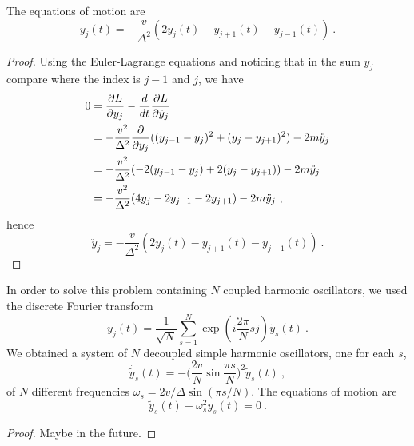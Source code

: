     The equations of motion are 
    \begin{equation*}
        \ddot y_j (t) = - \frac{v}{\Delta^2} ( 2 y_j(t) - y_{j+1} (t) - y_{j-1}(t)) ~.
    \end{equation*}
    \begin{proof}
        Using the Euler-Lagrange equations and noticing that in the sum $y_j$ compare where the index is $j - 1$ and $j$, we have
        \begin{equation*}
        \begin{aligned}
            0 & = \frac{\partial L}{\partial y_j} - \frac{d}{dt} \frac{\partial L}{\partial\dot y_j} \\ & = - \frac{v^2}{\Delta^2} \frac{\partial}{\partial y_j} ((y_{j-1} - y_j)^2 + (y_j - y_{j+1})^2 ) - 2 m \ddot y_j \\ & = - \frac{ v^2}{\Delta^2} ( - 2 (y_{j-1} - y_j) + 2 (y_j - y_{j+1})) - 2 m \ddot y_j \\ & = - \frac{v^2}{\Delta^2} (4 y_j - 2 y_{j-1} - 2 y_{j+1}) - 2 m \ddot y_j ~, 
        \end{aligned}
        \end{equation*}
        hence 
        \begin{equation*}
            \ddot y_j = - \frac{v}{\Delta^2} ( 2 y_j(t) - y_{j+1} (t) - y_{j-1}(t)) ~.
        \end{equation*}
    \end{proof}

    In order to solve this problem containing $N$ coupled harmonic oscillators, we used the discrete Fourier transform
    \begin{equation*}
        y_j (t) = \frac{1}{\sqrt{N}} \sum_{s = 1}^N \exp(i \frac{2\pi}{N} s j) \tilde y_s(t) ~.
    \end{equation*}
    We obtained a system of $N$ decoupled simple harmonic oscillators, one for each $s$,
    \begin{equation*}
        \ddot{\tilde y_s} (t) = - \Big ( \frac{2 v}{N} \sin \frac{\pi s}{N}\Big)^2  \tilde y_s (t) ~,
    \end{equation*}
    of $N$ different frequencies $\omega_s = 2 v / \Delta \sin (\pi s /N)$. The equations of motion are 
    \begin{equation*}
        \tilde y_s (t) + \omega^2_s y_s (t) = 0 ~.
    \end{equation*}
    \begin{proof}
        Maybe in the future.
    \end{proof}

